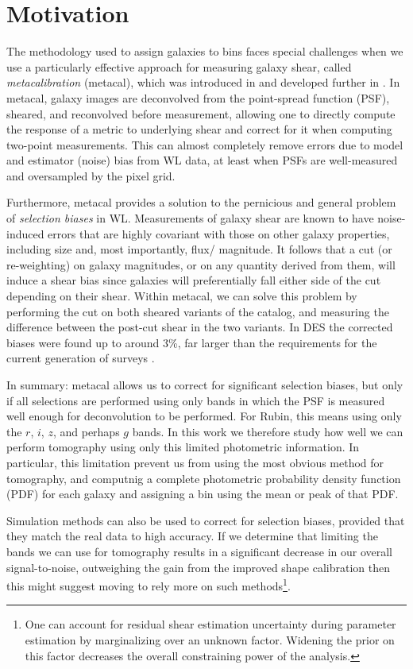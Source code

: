 \documentclass[twocolumn,twocolappendix]{aastex63}
\begin{document}
\section{Motivation}
\label{sec:motivation}

The methodology used to assign galaxies to bins faces special challenges when we use a particularly
effective approach for measuring galaxy shear, called \emph{metacalibration} (metacal),
which was introduced in \citet{sheldonhuff} and developed further in \citet{sheldon}.
In metacal, galaxy images are deconvolved from the point-spread function (PSF), sheared, and
reconvolved before measurement, allowing one to directly compute the response of a metric
to underlying shear and correct for it when computing two-point measurements.  This can
almost completely remove errors due to model and estimator (noise) bias from WL data, at least
when PSFs are well-measured and oversampled by the pixel grid.

Furthermore, metacal provides a solution to the pernicious and general problem of
\emph{selection biases} in WL.  Measurements of galaxy shear are known to have noise-induced errors
that are
highly covariant with those on other galaxy properties, including size and, most importantly, flux/
magnitude.  It follows that a cut (or re-weighting) on galaxy magnitudes, or on any quantity derived
from  them, will induce a shear bias since galaxies will preferentially fall either side of the cut
depending on their shear.  Within metacal, we can solve this problem by performing the cut on both
sheared variants of the catalog, and measuring the difference between the post-cut shear in the two
variants.  In DES the corrected biases were found up to around 3\%, far larger than
the requirements for the current generation of surveys \citep{des-y1-cat}.

In summary: metacal allows us to correct for significant selection biases, but only if all selections
are performed using only bands in which the PSF is measured well enough for deconvolution to be
performed.  For Rubin, this means using only the $r$, $i$, $z$, and perhaps $g$ bands.  In this work we
therefore study how well we can perform tomography using only this limited photometric information.  In
particular, this limitation prevent us from using the most obvious method for tomography,
and computnig a complete photometric probability density function (PDF) for each galaxy and assigning
a bin using the mean or peak of that PDF.

Simulation methods can also be used to correct for selection biases, provided that they match the
real data to high accuracy.  If we determine that limiting the bands we can use for tomography results
in a significant decrease in our overall signal-to-noise, outweighing the gain from the improved shape
calibration then this might suggest moving to rely more on such methods\footnote{One can account for
residual shear estimation uncertainty during parameter estimation by marginalizing over an unknown
factor.  Widening the prior on this factor decreases the overall constraining power of the analysis.}.
\end{document}
